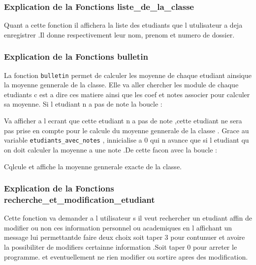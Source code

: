 \documentclass[12pt,a4paper]{article}
\begin{document}


\subsubsection{Explication de la Fonctions liste\_de\_la\_classe}
Quant a cette fonction il affichera la liste des etudiants que l utulisateur a deja enregistrer .Il donne respectivement leur nom, prenom et numero de dossier.








\subsubsection{Explication de la Fonctions bulletin}
La fonction \texttt{bulletin} permet de calculer les moyenne de chaque etudiant ainsique la moyenne gennerale de la classe.
Elle va aller chercher les module de chaque etudiants c est a dire ces matiere ainsi que les coef et notes associer pour calculer sa moyenne.
Si l etudiant n a pas de note la boucle :

Va afficher a l ecrant que cette etudiant n a pas de note ,cette etudiant ne sera pas prise en compte pour le calcule du moyenne gennerale de la classe .
Grace au variable \texttt{etudiants\_avec\_notes} , innicialise a 0 qui n avance que si l etudiant qu on doit calculer la moyenne a une note .De cette facon avec 
la boucle :

Cqlcule et affiche la moyenne gennerale exacte de la classe.








\subsubsection{Explication de la Fonctions recherche\_et\_modification\_etudiant}
Cette fonction va demander a l utilisateur s il veut rechercher un etudiant affin de modifier 
ou non ces information personnel ou academiques en l affichant un message lui permettantde faire deux choix
soit taper 3 pour contunuer et avoire la possibiliter de modifiers certainne information .Soit taper 0 pour arreter le programme.
et eventuellement ne rien modifier ou sortire apres des modification.
\end{document}
